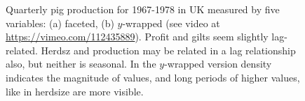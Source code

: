 \documentclass[12pt]{article}
\begin{document}
\begin{itemize}
\begin{center}
\begin{figure}[htp]
\caption{\label{fig:y-wrapping}Quarterly pig production for
1967-1978 in UK measured by five variables: (a) faceted, (b)
$y$-wrapped (see video at \url{https://vimeo.com/112435889}).
Profit and gilts seem slightly lag-related. Herdsz and
production may be related in a lag relationship also, but
neither is seasonal. In the $y$-wrapped version density indicates
the magnitude of values, and long periods of higher values,
like in herdsize are more visible. }
\end{figure}

\end{center}


\end{itemize}
\end{document}
